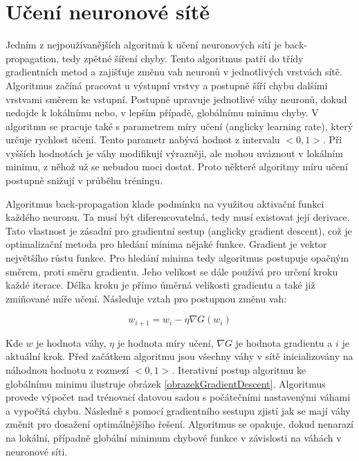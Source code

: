 \section{Učení neuronové sítě}
Jedním z nejpoužívanějších algoritmů k učení neuronových sítí
je back-propagation, tedy zpětné šíření chyby.
Tento algoritmus patří do třídy gradientních metod
a zajišťuje změnu vah neuronů v jednotlivých vrstvách sítě.
Algoritmus začíná pracovat u výstupní vrstvy
a postupně šíří chybu dalšími vrstvami směrem ke vstupní.
Postupně upravuje jednotlivé váhy neuronů,
dokud nedojde k lokálnímu nebo, 
v lepším případě, globálnímu minimu chyby.
V algoritmu se pracuje také s parametrem míry učení (anglicky learning rate), který určuje rychlost učení.
Tento parametr nabývá hodnot z intervalu $<0,1>$.
Při vyšších hodnotách je váhy modifikují výrazněji,
ale mohou uváznout v lokálním minimu, z něhož už se nebudou moci dostat.
Proto některé algoritmy míru učení postupně snižují v průběhu tréningu.
\par

Algoritmus back-propagation klade podmínku na využitou aktivační funkci každého neuronu.
Ta musí být diferencovatelná, tedy musí existovat její derivace.
Tato vlastnost je zásadní pro gradientní sestup (anglicky gradient descent),
což je optimalizační metoda pro hledání minima nějaké funkce.
Gradient je vektor největšího růstu funkce.
Pro hledání minima tedy algoritmus postupuje opačným směrem,
proti směru gradientu.
Jeho velikost se dále používá pro určení kroku každé iterace.
Délka kroku je přímo úměrná velikosti gradientu 
a také již zmiňované míře učení.
Následuje vztah pro postupnou změnu vah:

\begin{equation}
    w_{i+1} = w_i - \eta \nabla G(w_i)
\end{equation}

Kde $w$ je hodnota váhy, $\eta$ je hodnota míry učení, 
$\nabla G$ je hodnota gradientu a $i$ je aktuální krok.
Před začátkem algoritmu jsou všechny váhy v sítě
inicializovány na náhodnou hodnotu z rozmezí $<0,1>$.
Iterativní postup algoritmu ke globálnímu minimu 
ilustruje obrázek \ref{obrazekGradientDescent}.
Algoritmus provede výpočet nad trénovací datovou sadou 
s počátečními nastavenými váhami
a vypočítá chybu.
Následně s pomocí gradientního sestupu zjistí
jak se mají váhy změnit pro dosažení optimálnějšího řešení.
Algoritmus se opakuje, dokud nenarazí na lokální,
případně globální minimum chybové funkce v závislosti na váhách v neuronové síti.
\cite{Raschka_GradientDescent, Goodfellow-et-al-2016}

